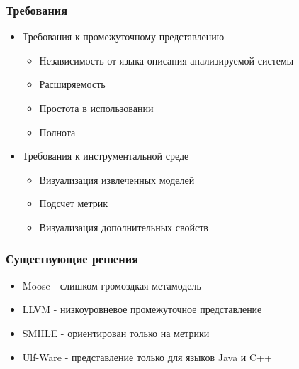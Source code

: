 \documentclass{beamer}
\begin{document}
\begin{frame}
\frametitle{Требования}

\begin{itemize}
    \item Требования к промежуточному представлению
        \begin{itemize}
            \item Независимость от языка описания анализируемой системы
            \item Расширяемость
            \item Простота в использовании
            \item Полнота
        \end{itemize}
    \item Требования к инструментальной среде
        \begin{itemize}
            \item Визуализация извлеченных моделей
            \item Подсчет метрик
            \item Визуализация дополнительных свойств
        \end{itemize}
\end{itemize}

\end{frame}
\begin{frame}
\frametitle{Существующие решения}

\begin{itemize}
    \item Moose - слишком громоздкая метамодель
    \item LLVM - низкоуровневое промежуточное представление
    \item SMIILE - ориентирован только на метрики
    \item Ulf-Ware - представление только для языков Java и C++
\end{itemize}

\end{frame}
\end{document}
